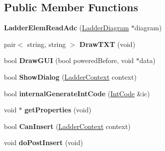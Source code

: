 \subsection*{Public Member Functions}
\begin{DoxyCompactItemize}
\item 
\hypertarget{class_ladder_elem_read_adc_a609a8fd02633a47512f165c44daf32cb}{{\bfseries Ladder\-Elem\-Read\-Adc} (\hyperlink{class_ladder_diagram}{Ladder\-Diagram} $\ast$diagram)}\label{class_ladder_elem_read_adc_a609a8fd02633a47512f165c44daf32cb}

\item 
\hypertarget{class_ladder_elem_read_adc_ae695f6bfca57f4c06188c80738a46943}{pair$<$ string, string $>$ {\bfseries Draw\-T\-X\-T} (void)}\label{class_ladder_elem_read_adc_ae695f6bfca57f4c06188c80738a46943}

\item 
\hypertarget{class_ladder_elem_read_adc_ad6c8eeecd10ebea4f7863fb817a057a1}{bool {\bfseries Draw\-G\-U\-I} (bool powered\-Before, void $\ast$data)}\label{class_ladder_elem_read_adc_ad6c8eeecd10ebea4f7863fb817a057a1}

\item 
\hypertarget{class_ladder_elem_read_adc_ac15b42cd8042c2177f1b56a1a810f181}{bool {\bfseries Show\-Dialog} (\hyperlink{struct_ladder_context}{Ladder\-Context} context)}\label{class_ladder_elem_read_adc_ac15b42cd8042c2177f1b56a1a810f181}

\item 
\hypertarget{class_ladder_elem_read_adc_a6ca250da8838f8d222ccbb630e350ce2}{bool {\bfseries internal\-Generate\-Int\-Code} (\hyperlink{class_int_code}{Int\-Code} \&ic)}\label{class_ladder_elem_read_adc_a6ca250da8838f8d222ccbb630e350ce2}

\item 
\hypertarget{class_ladder_elem_read_adc_a5e16d53117f0665d4ee97d63407c9cea}{void $\ast$ {\bfseries get\-Properties} (void)}\label{class_ladder_elem_read_adc_a5e16d53117f0665d4ee97d63407c9cea}

\item 
\hypertarget{class_ladder_elem_read_adc_a443d7080a2dad22755c6503d49b3358e}{bool {\bfseries Can\-Insert} (\hyperlink{struct_ladder_context}{Ladder\-Context} context)}\label{class_ladder_elem_read_adc_a443d7080a2dad22755c6503d49b3358e}

\item 
\hypertarget{class_ladder_elem_read_adc_a8daa7f694c4b1de2114a8a48ed602d81}{void {\bfseries do\-Post\-Insert} (void)}\label{class_ladder_elem_read_adc_a8daa7f694c4b1de2114a8a48ed602d81}


\end{DoxyCompactItemize}
